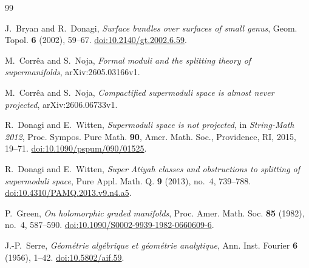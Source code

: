 \documentclass[11pt,a4paper,dvipsnames]{amsart}
\numberwithin{equation}{section}
\theoremstyle{plain}
\theoremstyle{definition}
\begin{document}
\begin{thebibliography}{99}

J.~Bryan and R.~Donagi,
\emph{Surface bundles over surfaces of small genus},
Geom. Topol. \textbf{6} (2002), 59--67.
\href{https://doi.org/10.2140/gt.2002.6.59}{doi:10.2140/gt.2002.6.59}.

M.~Corr\^ea and S.~Noja,
\emph{Formal moduli and the splitting theory of supermanifolds},
arXiv:2605.03166v1.

M.~Corr\^ea and S.~Noja,
\emph{Compactified supermoduli space is almost never projected},
arXiv:2606.06733v1.

R.~Donagi and E.~Witten,
\emph{Supermoduli space is not projected},
in \emph{String-Math 2012}, Proc. Sympos. Pure Math. \textbf{90},
Amer. Math. Soc., Providence, RI, 2015, 19--71.
\href{https://doi.org/10.1090/pspum/090/01525}{doi:10.1090/pspum/090/01525}.

R.~Donagi and E.~Witten,
\emph{Super Atiyah classes and obstructions to splitting of supermoduli
space},
Pure Appl. Math. Q. \textbf{9} (2013), no.~4, 739--788.
\href{https://doi.org/10.4310/PAMQ.2013.v9.n4.a5}%
{doi:10.4310/PAMQ.2013.v9.n4.a5}.

P.~Green,
\emph{On holomorphic graded manifolds},
Proc. Amer. Math. Soc. \textbf{85} (1982), no.~4, 587--590.
\href{https://doi.org/10.1090/S0002-9939-1982-0660609-6}%
{doi:10.1090/S0002-9939-1982-0660609-6}.

J.-P.~Serre,
\emph{G\'eom\'etrie alg\'ebrique et g\'eom\'etrie analytique},
Ann. Inst. Fourier \textbf{6} (1956), 1--42.
\href{https://doi.org/10.5802/aif.59}{doi:10.5802/aif.59}.

\end{thebibliography}
\end{document}
